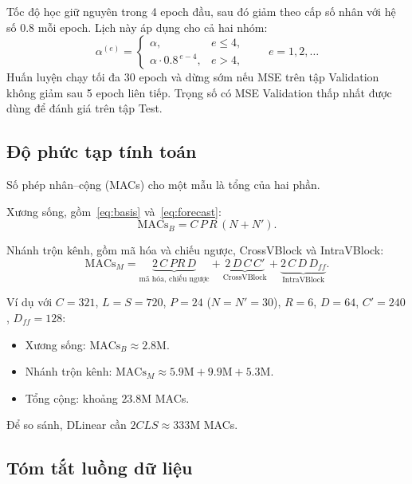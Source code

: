 \documentclass[12pt,a4paper]{report}
\numberwithin{equation}{chapter}
\begin{document}
Tốc độ học giữ nguyên trong 4 epoch đầu, sau đó giảm theo cấp số nhân với hệ số $0.8$ mỗi epoch. Lịch này áp dụng
cho cả hai nhóm:
\begin{equation}
\alpha^{(e)} = \begin{cases}\alpha, & e\le 4,\\ \alpha\cdot 0.8^{\,e-4}, & e>4,\end{cases}
\qquad e=1,2,\dots
\label{eq:lr-schedule}
\end{equation}
Huấn luyện chạy tối đa 30 epoch và dừng sớm nếu MSE trên tập Validation không giảm sau 5 epoch liên tiếp. Trọng số
có MSE Validation thấp nhất được dùng để đánh giá trên tập Test.

\subsection{Độ phức tạp tính toán}
\label{sec:complexity}

Số phép nhân--cộng (MACs) cho một mẫu là tổng của hai phần.

Xương sống, gồm~\eqref{eq:basis} và~\eqref{eq:forecast}:
\begin{equation}
\text{MACs}_{B} = C\,P\,R\,(N+N').
\label{eq:macs-backbone}
\end{equation}

Nhánh trộn kênh, gồm mã hóa và chiếu ngược, CrossVBlock và IntraVBlock:
\begin{equation}
\text{MACs}_{M} = \underbrace{2\,C\,PR\,D}_{\text{mã hóa, chiếu ngược}}
+ \underbrace{2\,D\,C\,C'}_{\text{CrossVBlock}}
+ \underbrace{2\,C\,D\,D_{ff}}_{\text{IntraVBlock}} .
\label{eq:macs-mix}
\end{equation}

Ví dụ với $C=321$, $L=S=720$, $P=24$ ($N=N'=30$), $R=6$, $D=64$, $C'=240$, $D_{ff}=128$:
\begin{itemize}
  \item Xương sống: $\text{MACs}_B\approx 2.8$M.
  \item Nhánh trộn kênh: $\text{MACs}_M\approx 5.9\text{M}+9.9\text{M}+5.3\text{M}$.
  \item Tổng cộng: khoảng $23.8$M MACs.
\end{itemize}
Để so sánh, DLinear cần $2CLS\approx 333$M MACs.

\subsection{Tóm tắt luồng dữ liệu}
\end{document}
